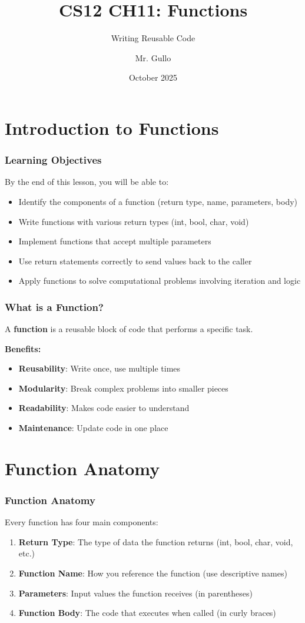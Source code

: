 \documentclass{beamer}
\title[Functions]{CS12 CH11: Functions}
\subtitle{Writing Reusable Code}
\author[Mr. Gullo]{Mr. Gullo}
\date[Oct 2025]{October 2025}
\begin{document}
\frame{\titlepage}

\section{Introduction to Functions}

\begin{frame}
\frametitle{Learning Objectives}
By the end of this lesson, you will be able to:
\begin{itemize}
    \item Identify the components of a function (return type, name, parameters, body)
    \item Write functions with various return types (int, bool, char, void)
    \item Implement functions that accept multiple parameters
    \item Use return statements correctly to send values back to the caller
    \item Apply functions to solve computational problems involving iteration and logic
\end{itemize}
\end{frame}

\begin{frame}
\frametitle{What is a Function?}
A \textbf{function} is a reusable block of code that performs a specific task.\pause

\textbf{Benefits:}
\begin{itemize}
    \item \textbf{Reusability}: Write once, use multiple times
    \item \textbf{Modularity}: Break complex problems into smaller pieces
    \item \textbf{Readability}: Makes code easier to understand
    \item \textbf{Maintenance}: Update code in one place
\end{itemize}
\end{frame}

\section{Function Anatomy}

\begin{frame}
\frametitle{Function Anatomy}
Every function has four main components:\pause

\begin{enumerate}
    \item \textbf{Return Type}: The type of data the function returns (int, bool, char, void, etc.)
    \item \textbf{Function Name}: How you reference the function (use descriptive names)
    \item \textbf{Parameters}: Input values the function receives (in parentheses)
    \item \textbf{Function Body}: The code that executes when called (in curly braces)
\end{enumerate}
\end{frame}
\end{document}
